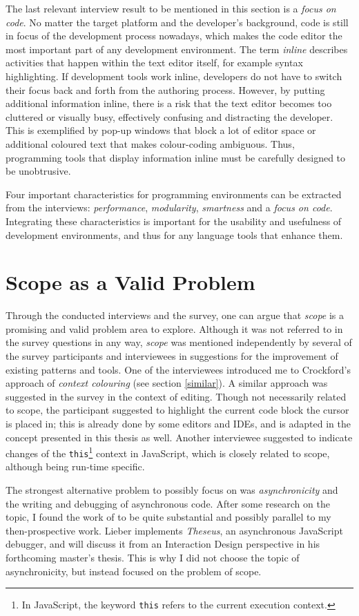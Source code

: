The last relevant interview result to be mentioned in this section is a
\emph{focus on code}. No matter the target platform and the developer’s
background, code is still in focus of the development process nowadays,
which makes the code editor the most important part of any development
environment. The term \emph{inline} describes activities that happen
within the text editor itself, for example syntax highlighting. If
development tools work inline, developers do not have to switch their
focus back and forth from the authoring process. However, by putting
additional information inline, there is a risk that the text editor
becomes too cluttered or visually busy, effectively confusing and
distracting the developer. This is exemplified by pop-up windows that
block a lot of editor space or additional coloured text that makes
colour-coding ambiguous. Thus, programming tools that display
information inline must be carefully designed to be unobtrusive.

Four important characteristics for programming environments can be
extracted from the interviews: \emph{performance}, \emph{modularity},
\emph{smartness} and a \emph{focus on code}. Integrating these
characteristics is important for the usability and usefulness of
development environments, and thus for any language tools that enhance
them.

\section{Scope as a Valid Problem}\label{scope-as-a-valid-problem}

Through the conducted interviews and the survey, one can argue that
\emph{scope} is a promising and valid problem area to explore. Although
it was not referred to in the survey questions in any way, \emph{scope}
was mentioned independently by several of the survey participants and
interviewees in suggestions for the improvement of existing patterns and
tools. One of the interviewees introduced me to Crockford’s
\citeyear{crockford} approach of \emph{context colouring} (see section
\ref{similar}). A similar approach was suggested in the survey in the
context of editing. Though not necessarily related to scope, the
participant suggested to highlight the current code block the cursor is
placed in; this is already done by some editors and IDEs, and is adapted
in the concept presented in this thesis as well. Another interviewee
suggested to indicate changes of the
\texttt{this}\footnote{In JavaScript, the keyword \texttt{\gls{this}} refers to the current execution context.}
context in JavaScript, which is closely related to scope, although being
run-time specific.

The strongest alternative problem to possibly focus on was
\emph{asynchronicity} and the writing and debugging of asynchronous
code. After some research on the topic, I found the work of
 to be quite substantial and possibly parallel to my
then-prospective work. Lieber implements \emph{Theseus}, an asynchronous
JavaScript debugger, and will discuss it from an Interaction Design
perspective in his forthcoming master’s thesis. This is why I did not
choose the topic of asynchronicity, but instead focused on the problem
of scope.
